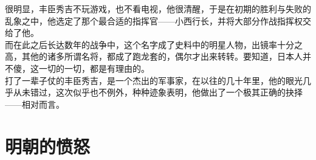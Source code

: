 \begin{multicols}{\theparacolNo}
很明显，丰臣秀吉不玩游戏，也不看电视，他很清醒，于是在初期的胜利与失败的乱象之中，他选定了那个最合适的指挥官——小西行长，并将大部分作战指挥权交给了他。\\

而在此之后长达数年的战争中，这个名字成了史料中的明星人物，出镜率十分之高，其他的诸多所谓名将，都成了跑龙套的，偶尔才出来转转。要知道，日本人并不傻，这一切的一切，都是有理由的。\\

打了一辈子仗的丰臣秀吉，是一个杰出的军事家，在以往的几十年里，他的眼光几乎从未错过，这次似乎也不例外，种种迹象表明，他做出了一个极其正确的抉择——相对而言。\\

\ifnum{}
	\end{multicols}
\fi
\newpage

\section{明朝的愤怒}
\ifnum{}
